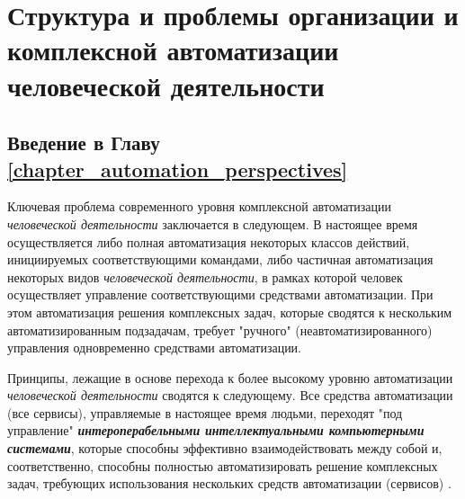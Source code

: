 \chapter{Структура и проблемы организации и комплексной автоматизации человеческой деятельности}
\label{chapter_automation_perspectives}

\vspace{-7\baselineskip}

\begin{SCn}


\end{SCn}

\section*{Введение в Главу \ref{chapter_automation_perspectives}}
Ключевая проблема современного уровня комплексной автоматизации \textit{человеческой деятельности} заключается в следующем. В настоящее время осуществляется либо полная автоматизация некоторых классов действий, инициируемых соответствующими командами, либо частичная автоматизация некоторых видов \textit{человеческой деятельности}, в рамках которой человек осуществляет управление соответствующими средствами автоматизации. При этом автоматизация решения комплексных задач, которые сводятся к нескольким  автоматизированным подзадачам, требует "ручного"{} (неавтоматизированного) управления одновременно  средствами автоматизации.

Принципы, лежащие в основе перехода к более высокому уровню автоматизации \textit{человеческой деятельности} сводятся к следующему. Все средства автоматизации (все сервисы), управляемые в настоящее время людьми, переходят "под управление"{} \textbf{\textit{интероперабельными интеллектуальными компьютерными системами}}, которые способны эффективно взаимодействовать между собой и, соответственно, способны полностью автоматизировать решение комплексных задач, требующих использования нескольких средств автоматизации (сервисов) .

